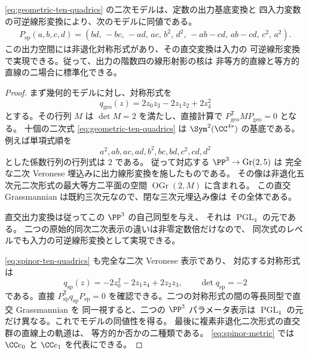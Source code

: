 \begin{lemma}[直交作用による標準化]
\label{lem:spinor-orthogonal-normalization}
\eqref{eq:geometric-ten-quadrics} の二次モデルは、定数の出力基底変換と
四入力変数の可逆線形変換により、次のモデルに同値である。
\begin{equation}
 \begin{split}
 P_{\mathrm{sp}}(a,b,c,d)=
 (bd,\,-bc,\,-ad,\,ac,\,b^2,\,d^2,\,-ab-cd,\,ab-cd,\,c^2,\,a^2).
 \end{split}
 \label{eq:spinor-ten-quadrics}
\end{equation}
この出力空間には非退化対称形式があり、その直交変換は入力の
可逆線形変換で実現できる。従って、出力の階数四の線形射影の核は
非等方的直線と等方的直線の二場合に標準化できる。
\end{lemma}

\begin{proof}
まず幾何的モデルに対し、対称形式を
\[
 q_{\mathrm{geo}}(z)=2z_0z_3-2z_1z_2+2z_4^2
\]
とする。その行列 $M$ は $\det M=2$ を満たし、直接計算で
$P_{\mathrm{geo}}^{\mathsf T}M P_{\mathrm{geo}}=0$ となる。
十個の二次式 \eqref{eq:geometric-ten-quadrics} は
$\Sym^2(\CC^{4*})$ の基底である。
例えば単項式順を
\[
 a^2,ab,ac,ad,b^2,bc,bd,c^2,cd,d^2
\]
とした係数行列の行列式は $2$ である。
従って対応する $\PP^3\to\operatorname{Gr}(2,5)$ は
完全な二次 Veronese 埋込みに出力線形変換を施したものである。
その像は非退化五次元二次形式の最大等方二平面の空間
$\operatorname{OGr}(2,M)$ に含まれる。
この直交 Grassmannian は既約三次元なので、閉な三次元埋込み像は
その全体である。

直交出力変換は従ってこの $\PP^3$ の自己同型を与え、
それは $\operatorname{PGL}_4$ の元である。
二つの原始的同次二次表示の違いは非零定数倍だけなので、
同次式のレベルでも入力の可逆線形変換として実現できる。

\eqref{eq:spinor-ten-quadrics} も完全な二次 Veronese 表示であり、
対応する対称形式は
\begin{equation}
 q_{\mathrm{sp}}(z)=-2z_0^2-2z_1z_4+2z_2z_3,
 \qquad \det q_{\mathrm{sp}}=-2
 \label{eq:spinor-metric}
\end{equation}
である。直接 $P_{\mathrm{sp}}^{\mathsf T}q_{\mathrm{sp}}P_{\mathrm{sp}}=0$
を確認できる。二つの対称形式の間の等長同型で直交 Grassmannian を
同一視すると、二つの $\PP^3$ パラメータ表示は $\operatorname{PGL}_4$
の元だけ異なる。これでモデルの同値性を得る。
最後に複素非退化二次形式の直交群の直線上の軌道は、
等方的か否かの二種類である。
\eqref{eq:spinor-metric} では $\CC e_0$ と $\CC e_1$ を代表にできる。
\end{proof}


